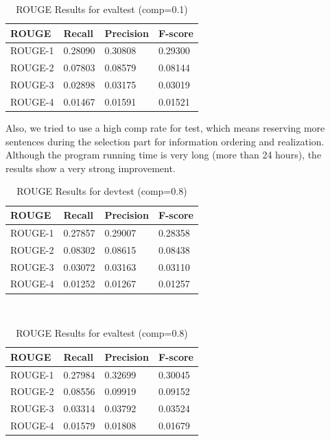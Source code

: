 \documentclass[11pt]{article}
\begin{document}
\begin{table}[!ht]
\centering
\caption{ROUGE Results for evaltest (comp=0.1)}
\begin{tabular}{|l|l|l|l|}
\hline
ROUGE   & Recall  & Precision & F-score \\ \hline
ROUGE-1 & 0.28090 & 0.30808   & 0.29300 \\ \hline
ROUGE-2 & 0.07803 & 0.08579   & 0.08144 \\ \hline
ROUGE-3 & 0.02898 & 0.03175   & 0.03019 \\ \hline
ROUGE-4 & 0.01467 & 0.01591   & 0.01521 \\ \hline
\end{tabular}
\end{table}

Also, we tried to use a high comp rate for test, which means reserving more sentences during the selection part for information ordering and realization. Although the program running time is very long (more than 24 hours), the results show a very strong improvement.\\
\begin{table}[!ht]
\centering
\caption{ROUGE Results for devtest (comp=0.8)}
\begin{tabular}{|l|l|l|l|}
\hline
ROUGE   & Recall  & Precision & F-score \\ \hline
ROUGE-1 & 0.27857 & 0.29007   & 0.28358 \\ \hline
ROUGE-2 & 0.08302 & 0.08615   & 0.08438 \\ \hline
ROUGE-3 & 0.03072 & 0.03163   & 0.03110 \\ \hline
ROUGE-4 & 0.01252 & 0.01267   & 0.01257 \\ \hline
\end{tabular}
\end{table}\\
\begin{table}[!ht]
\centering
\caption{ROUGE Results for evaltest (comp=0.8)}
\begin{tabular}{|l|l|l|l|}
\hline
ROUGE   & Recall  & Precision & F-score \\ \hline
ROUGE-1 & 0.27984 & 0.32699   & 0.30045 \\ \hline
ROUGE-2 & 0.08556 & 0.09919   & 0.09152 \\ \hline
ROUGE-3 & 0.03314 & 0.03792   & 0.03524 \\ \hline
ROUGE-4 & 0.01579 & 0.01808   & 0.01679 \\ \hline
\end{tabular}
\end{table}\\
\end{document}
